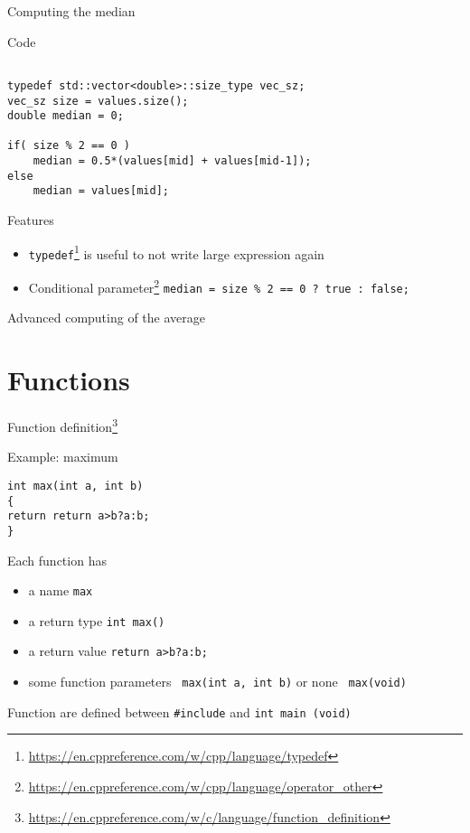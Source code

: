 \documentclass[12pt]{beamer}
\begin{document}
\begin{frame}[fragile]{Computing the median}

\begin{block}{Code}
\begin{lstlisting}

typedef std::vector<double>::size_type vec_sz;
vec_sz size = values.size();
double median = 0;

if( size % 2 == 0 ) 
	median = 0.5*(values[mid] + values[mid-1]);
else
	median = values[mid];
\end{lstlisting}
\end{block}

\begin{block}{Features}
\begin{itemize}
\item \lstinline|typedef|\footnote{\tiny\url{https://en.cppreference.com/w/cpp/language/typedef}} is useful to not write large expression again
\item Conditional parameter\footnote{\tiny\url{https://en.cppreference.com/w/cpp/language/operator_other}} \lstinline|median = size % 2 == 0 ? true : false; |
\end{itemize}
\end{block}
\end{frame}

\begin{frame}{Advanced computing of the average}



\end{frame}

\section{Functions}

\begin{frame}[fragile]{Function definition\footnote{\tiny\url{https://en.cppreference.com/w/c/language/function_definition}}}

\begin{block}{Example: maximum}
\begin{lstlisting}
int max(int a, int b)
{
return return a>b?a:b;
}

\end{lstlisting}
\end{block}
\begin{block}{Each function has}
\begin{itemize}
\item a name \lstinline|max|
\item a return type \lstinline|int max()|
\item a return value \lstinline|return a>b?a:b;|
\item some function parameters \lstinline| max(int a, int b)| or none \lstinline| max(void) |
\end{itemize}
\end{block}
Function are defined between \lstinline|#include| and \lstinline|int main (void)|
\end{frame}
\end{document}
